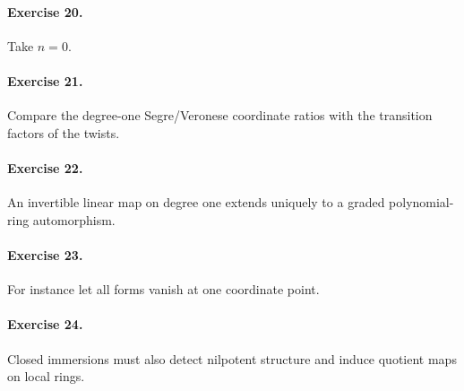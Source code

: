 \paragraph{Exercise 20.} Take \(n=0\).

\paragraph{Exercise 21.} Compare the degree-one Segre/Veronese coordinate ratios with the transition factors of the twists.

\paragraph{Exercise 22.} An invertible linear map on degree one extends uniquely to a graded polynomial-ring automorphism.

\paragraph{Exercise 23.} For instance let all forms vanish at one coordinate point.

\paragraph{Exercise 24.} Closed immersions must also detect nilpotent structure and induce quotient maps on local rings.
